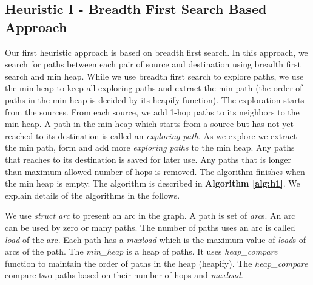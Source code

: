 \subsection{Heuristic I - Breadth First Search Based Approach}

Our first heuristic approach is based on breadth first search. In this approach, we search for paths between each pair of source and destination using breadth first search and min heap. While we use breadth first search to explore paths, we use the min heap to keep all exploring paths and extract the min path (the order of paths in the min heap is decided by its heapify function). The exploration starts from the sources. From each source, we add 1-hop paths to its neighbors to the min heap. A path in the min heap which starts from a source but has not yet reached to its destination is called an \textit{exploring path}. As we explore we extract the min path, form and add more \textit{exploring paths} to the min heap. Any paths that reaches to its destination is saved for later use. Any paths that is longer than maximum allowed number of hops is removed. The algorithm finishes when the min heap is empty. The algorithm is described in \textbf{Algorithm \ref{alg:h1}}. We explain details of the algorithms in the follows.

We use \textit{struct arc} to present an arc in the graph. A path is set of \textit{arc}s. An arc can be used by zero or many paths. The number of paths uses an arc is called \textit{load} of the arc. Each path has a \textit{maxload} which is the maximum value of \textit{load}s of arcs of the path. The \textit{min\_heap} is a heap of paths. It uses \textit{heap\_compare} function to maintain the order of paths in the heap (heapify). The \textit{heap\_compare} compare two paths based on their number of hops and \textit{maxload}.

